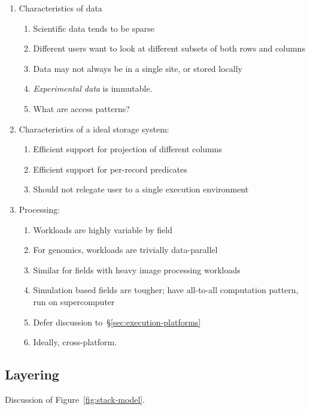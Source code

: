 \documentclass{acm_proc_article-sp}
\begin{document}
\begin{enumerate}
\item Characteristics of data
\begin{enumerate}
\item Scientific data tends to be sparse
\item Different users want to look at different subsets of both rows and columns
\item Data may not always be in a single site, or stored locally
\item \emph{Experimental data} is immutable.
\item What are access patterns?
\end{enumerate}
\item Characteristics of a ideal storage system:
\begin{enumerate}
\item Efficient support for projection of different columns
\item Efficient support for per-record predicates
\item Should not relegate user to a single execution environment
\end{enumerate}
\item Processing:
\begin{enumerate}
\item Workloads are highly variable by field
\item For genomics, workloads are trivially data-parallel
\item Similar for fields with heavy image processing workloads
\item Simulation based fields are tougher; have all-to-all computation pattern, run on supercomputer
\item Defer discussion to~\S\ref{sec:execution-platforms}
\item Ideally, cross-platform.
\end{enumerate}
\end{enumerate}

\subsection{Layering}
\label{sec:layering}

Discussion of Figure~\ref{fig:stack-model}.
\end{document}
